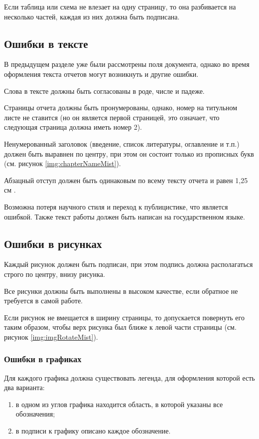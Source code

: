 Если таблица или схема не влезает на одну страницу, то она разбивается на несколько частей, каждая из них должна быть подписана.

\subsection{Ошибки в тексте}
В предыдущем разделе уже были рассмотрены поля документа, однако во время оформления текста отчетов могут возникнуть и другие ошибки.

Слова в тексте должны быть согласованы в роде, числе и падеже.

Страницы отчета должны быть пронумерованы, однако, номер на титульном листе не ставится (но он является первой страницей, это означает, что следующая страница должна иметь номер 2).

Ненумерованный заголовок (введение, список литературы, оглавление и т.п.) должен быть выравнен по центру, при этом он состоит только из прописных букв (см. рисунок \ref{img:chapterNameMist}).

Абзацный отступ должен быть одинаковым по всему тексту отчета и равен 1,25 см \cite{GOST732}.

Возможна потеря научного стиля и переход к публицистике, что является ошибкой. Также текст работы должен быть написан на государственном языке.

\subsection{Ошибки в рисунках}
Каждый рисунок должен быть подписан, при этом подпись должна располагаться строго по центру, внизу рисунка.

Все рисунки должны быть выполнены в высоком качестве, если обратное не требуется в самой работе.

Если рисунок не вмещается в ширину страницы, то допускается повернуть его таким образом, чтобы верх рисунка был ближе к левой части страницы (см. рисунок \ref{img:imgRotateMist}).

\subsubsection{Ошибки в графиках}
Для каждого графика должна существовать легенда, для оформления которой есть два варианта:
\begin{enumerate}
	\item в одном из углов графика находится область, в которой указаны все обозначения;
	\item в подписи к графику описано каждое обозначение.
\end{enumerate}

